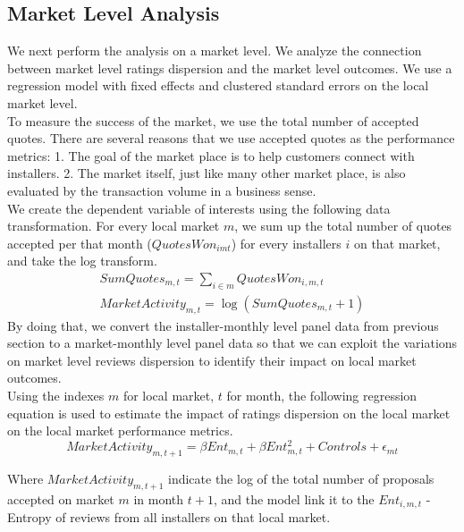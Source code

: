 \documentclass[msom,blindrev]{informs3}
\begin{document}
\subsection{Market Level Analysis}
We next perform the analysis on a market level. We analyze the connection between market level ratings dispersion and the market level outcomes.  We use a regression model with fixed effects and clustered standard errors on the local market level. \\
To measure the success of the market, we use the total number of accepted quotes. There are several reasons that we use accepted quotes as the performance metrics: 1. The goal of the market place is to help customers connect with installers. 2. The market itself, just like many other market place, is also evaluated by the transaction volume in a business sense. \\
We create the dependent variable of interests using the following data transformation. For every local market $m$, we sum up the total number of quotes accepted per that month ($QuotesWon_{imt}$) for every installers $i$ on that market, and take the log transform. 
\begin{align*}
SumQuotes_{m,t}=\sum_{i\in m} QuotesWon_{i,m,t}\\
MarketActivity_{m,t}=\log (SumQuotes_{m,t}+1)
\end{align*}
By doing that, we convert the installer-monthly level panel data from previous section to a market-monthly level panel data so that we can exploit the variations on market level reviews dispersion to identify their impact on local market outcomes.  \\
Using the indexes $m$ for local market, $t$ for month, the following regression equation is used to estimate the impact of ratings dispersion on the local market on the local market performance metrics. 
\begin{equation}
    MarketActivity_{m,t+1}=\beta Ent_{m,t}+\beta Ent_{m,t}^2+Controls+\epsilon_{mt}
\end{equation}

Where $MarketActivity_{m,t+1}$ indicate the log of the total number of proposals accepted on market $m$ in month $t+1$, and the model link it to the $Ent_{i,m,t}$ - Entropy of reviews from all installers on that local market. 
\end{document}
